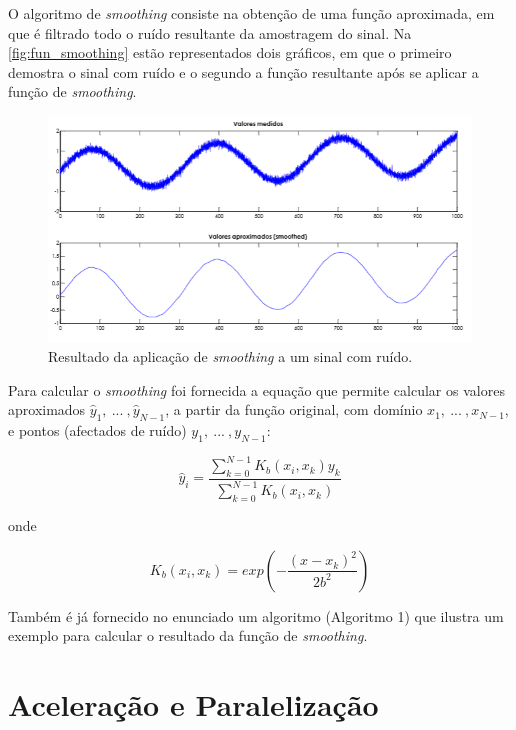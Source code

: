 \documentclass[a4paper]{article}
\begin{document}
	O algoritmo de \textit{smoothing} consiste na obtenção de uma função aproximada, em que é filtrado todo o ruído resultante da amostragem do sinal. Na \autoref{fig:fun_smoothing} estão representados dois gráficos, em que o primeiro demostra o sinal com ruído e o segundo a função resultante após se aplicar a função de \textit{smoothing}.
	
		\begin{figure}[h]
			\centering
			\includegraphics[width=1.\textwidth]{img/fun_smoothing}
			\caption{Resultado da aplicação de \textit{smoothing} a um sinal com ruído. }
			\label{fig:fun_smoothing}
		\end{figure}
		
	Para calcular o \textit{smoothing} foi fornecida a equação que permite calcular os valores aproximados $\hat{y}_1,\ ...\ , \hat{y}_{N-1}$, a partir da função original, com domínio $x_1,\ ...\ ,x_{N-1}$, e pontos (afectados de ruído) $y_1,\ ...\ , y_{N-1}$:
	
	\begin{equation}
		\hat{y}_i =  \frac{ \sum_{k=0}^{N-1} K_b (x_i, x_k ) y_k}{\sum_{k=0}^{N-1} K_b (x_i, x_k )} 
		\label{eq:smoothing_function}
	\end{equation}
	
	onde
	
	\begin{equation}
		K_b (x_i,x_k)=exp\left(-\frac{(x-x_k)^2}{2b^2} \right)
		\label{eq:smoothing_kb}
	\end{equation}
	 	
	 	 
	Também é já fornecido no enunciado um algoritmo (Algoritmo 1) que ilustra um exemplo para calcular o resultado da função de \textit{smoothing}.
	
	
	\section{Aceleração e Paralelização}
	\label{sec:implementations}
	
\end{document}
